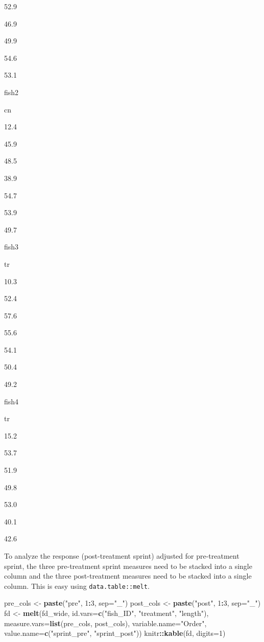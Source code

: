 \documentclass[]{book}
\newenvironment{Shaded}{\begin{snugshade}}{\end{snugshade}}
\newcommand{\KeywordTok}[1]{\textcolor[rgb]{0.13,0.29,0.53}{\textbf{#1}}}
\newcommand{\DataTypeTok}[1]{\textcolor[rgb]{0.13,0.29,0.53}{#1}}
\newcommand{\DecValTok}[1]{\textcolor[rgb]{0.00,0.00,0.81}{#1}}
\newcommand{\StringTok}[1]{\textcolor[rgb]{0.31,0.60,0.02}{#1}}
\newcommand{\OperatorTok}[1]{\textcolor[rgb]{0.81,0.36,0.00}{\textbf{#1}}}
\newcommand{\NormalTok}[1]{#1}
\begin{document}
52.9

46.9

49.9

54.6

53.1

fish2

cn

12.4

45.9

48.5

38.9

54.7

53.9

49.7

fish3

tr

10.3

52.4

57.6

55.6

54.1

50.4

49.2

fish4

tr

15.2

53.7

51.9

49.8

53.0

40.1

42.6

To analyze the response (post-treatment sprint) adjusted for
pre-treatment sprint, the three pre-treatment sprint measures need to be
stacked into a single column and the three post-treatment measures need
to be stacked into a single column. This is easy using
\texttt{data.table::melt}.

\begin{Shaded}
\begin{Highlighting}[]
\NormalTok{pre_cols <-}\StringTok{ }\KeywordTok{paste}\NormalTok{(}\StringTok{"pre"}\NormalTok{, }\DecValTok{1}\OperatorTok{:}\DecValTok{3}\NormalTok{, }\DataTypeTok{sep=}\StringTok{"_"}\NormalTok{)}
\NormalTok{post_cols <-}\StringTok{ }\KeywordTok{paste}\NormalTok{(}\StringTok{"post"}\NormalTok{, }\DecValTok{1}\OperatorTok{:}\DecValTok{3}\NormalTok{, }\DataTypeTok{sep=}\StringTok{"_"}\NormalTok{)}
\NormalTok{fd <-}\StringTok{ }\KeywordTok{melt}\NormalTok{(fd_wide,}
           \DataTypeTok{id.vars=}\KeywordTok{c}\NormalTok{(}\StringTok{"fish_ID"}\NormalTok{, }\StringTok{"treatment"}\NormalTok{, }\StringTok{"length"}\NormalTok{),}
           \DataTypeTok{measure.vars=}\KeywordTok{list}\NormalTok{(pre_cols, post_cols),}
           \DataTypeTok{variable.name=}\StringTok{"Order"}\NormalTok{,}
           \DataTypeTok{value.name=}\KeywordTok{c}\NormalTok{(}\StringTok{"sprint_pre"}\NormalTok{, }\StringTok{"sprint_post"}\NormalTok{))}
\NormalTok{knitr}\OperatorTok{::}\KeywordTok{kable}\NormalTok{(fd, }\DataTypeTok{digits=}\DecValTok{1}\NormalTok{)}
\end{Highlighting}
\end{Shaded}
\end{document}
